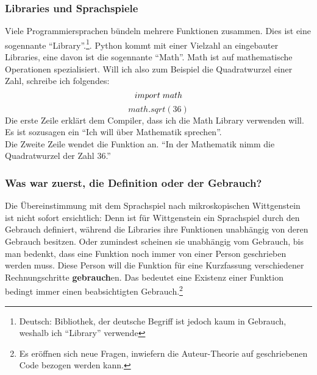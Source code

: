 \documentclass[10pt,a4paper]{article}
\begin{document}
\subsubsection{Libraries und Sprachspiele}
Viele Programmiersprachen bündeln mehrere Funktionen zusammen. Dies ist eine sogennante \enquote{Library}.\footnote{Deutsch: Bibliothek, der deutsche Begriff ist jedoch kaum in Gebrauch, weshalb ich \enquote{Library} verwende}. Python kommt mit einer Vielzahl an eingebauter Libraries, eine davon ist die sogennante \enquote{Math}. Math ist auf mathematische Operationen spezialisiert. Will ich also zum Beispiel die Quadratwurzel einer Zahl, schreibe ich folgendes:
$$import \hspace{1mm} math$$
$$math.sqrt(36)$$
Die erste Zeile erklärt dem Compiler, dass ich die Math Library verwenden will. Es ist sozusagen ein \enquote{Ich will über Mathematik sprechen}. \\
Die Zweite Zeile wendet die Funktion an. \enquote{In der Mathematik nimm die Quadratwurzel der Zahl 36.} \\

\subsubsection{Was war zuerst, die Definition oder der Gebrauch?}
Die Übereinstimmung mit dem Sprachspiel nach mikroskopischen Wittgenstein ist nicht sofort ersichtlich: Denn ist für Wittgenstein ein Sprachspiel durch den Gebrauch definiert, während die Libraries ihre Funktionen unabhängig von deren Gebrauch besitzen. Oder zumindest scheinen sie unabhängig vom Gebrauch, bis man bedenkt, dass eine Funktion noch immer von einer Person geschrieben werden muss. Diese Person will die Funktion für eine Kurzfassung verschiedener Rechnungschritte \textbf{gebrauch}en. Das bedeutet eine Existenz einer Funktion bedingt immer einen beabsichtigten Gebrauch.\footnote{Es eröffnen sich neue Fragen, inwiefern die Auteur-Theorie auf geschriebenen Code bezogen werden kann.}
\end{document}
